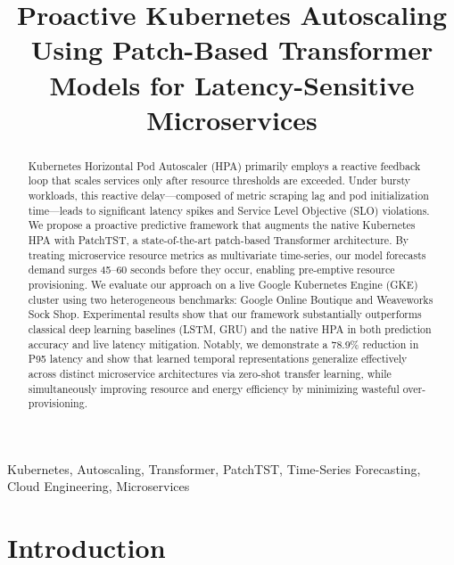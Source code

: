 \documentclass[conference]{IEEEtran}
\begin{document}
\title{Proactive Kubernetes Autoscaling Using Patch-Based Transformer Models for Latency-Sensitive Microservices}

\author{
}

\maketitle

\begin{abstract}
Kubernetes Horizontal Pod Autoscaler (HPA) primarily employs a reactive feedback loop that scales services only after resource thresholds are exceeded. Under bursty workloads, this reactive delay—composed of metric scraping lag and pod initialization time—leads to significant latency spikes and Service Level Objective (SLO) violations. We propose a proactive predictive framework that augments the native Kubernetes HPA with PatchTST, a state-of-the-art patch-based Transformer architecture. By treating microservice resource metrics as multivariate time-series, our model forecasts demand surges 45--60 seconds before they occur, enabling pre-emptive resource provisioning. We evaluate our approach on a live Google Kubernetes Engine (GKE) cluster using two heterogeneous benchmarks: Google Online Boutique and Weaveworks Sock Shop. Experimental results show that our framework substantially outperforms classical deep learning baselines (LSTM, GRU) and the native HPA in both prediction accuracy and live latency mitigation. Notably, we demonstrate a 78.9\% reduction in P95 latency and show that learned temporal representations generalize effectively across distinct microservice architectures via zero-shot transfer learning, while simultaneously improving resource and energy efficiency by minimizing wasteful over-provisioning.
\end{abstract}

\begin{IEEEkeywords}
Kubernetes, Autoscaling, Transformer, PatchTST, Time-Series Forecasting, Cloud Engineering, Microservices
\end{IEEEkeywords}

\section{Introduction}
\end{document}
